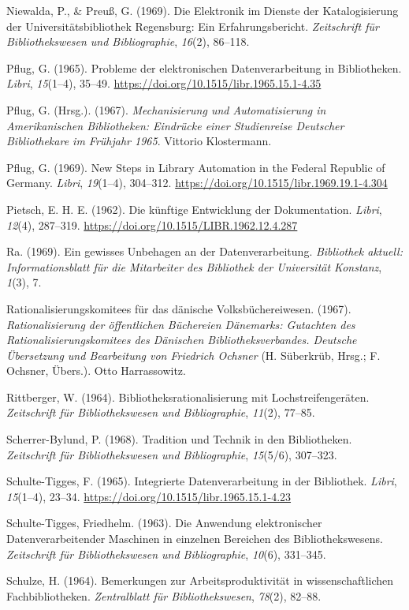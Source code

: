 \documentclass[a4paper,
fontsize=11pt,
oneside,
numbers=noperiodatend,
parskip=half-,
bibliography=totoc,
final
]{scrartcl}
\begin{document}
Niewalda, P., \& Preuß, G. (1969). Die Elektronik im Dienste der
Katalogisierung der Universitätsbibliothek Regensburg: Ein
Erfahrungsbericht. \emph{Zeitschrift für Bibliothekswesen und
Bibliographie}, \emph{16}(2), 86--118.

Pflug, G. (1965). Probleme der elektronischen Datenverarbeitung in
Bibliotheken. \emph{Libri}, \emph{15}(1--4), 35--49.
\url{https://doi.org/10.1515/libr.1965.15.1-4.35}

Pflug, G. (Hrsg.). (1967). \emph{Mechanisierung und Automatisierung in
Amerikanischen Bibliotheken: Eindrücke einer Studienreise Deutscher
Bibliothekare im Frühjahr 1965}. Vittorio Klostermann.

Pflug, G. (1969). New Steps in Library Automation in the Federal
Republic of Germany. \emph{Libri}, \emph{19}(1--4), 304--312.
\url{https://doi.org/10.1515/libr.1969.19.1-4.304}

Pietsch, E. H. E. (1962). Die künftige Entwicklung der Dokumentation.
\emph{Libri}, \emph{12}(4), 287--319.
\url{https://doi.org/10.1515/LIBR.1962.12.4.287}

Ra. (1969). Ein gewisses Unbehagen an der Datenverarbeitung.
\emph{Bibliothek aktuell: Informationsblatt für die Mitarbeiter des
Bibliothek der Universität Konstanz}, \emph{1}(3), 7.

Rationalisierungskomitees für das dänische Volksbüchereiwesen. (1967).
\emph{Rationalisierung der öffentlichen Büchereien Dänemarks: Gutachten
des Rationalisierungskomitees des Dänischen Bibliotheksverbandes.
Deutsche Übersetzung und Bearbeitung von Friedrich Ochsner} (H.
Süberkrüb, Hrsg.; F. Ochsner, Übers.). Otto Harrassowitz.

Rittberger, W. (1964). Bibliotheksrationalisierung mit
Lochstreifengeräten. \emph{Zeitschrift für Bibliothekswesen und
Bibliographie}, \emph{11}(2), 77--85.

Scherrer-Bylund, P. (1968). Tradition und Technik in den Bibliotheken.
\emph{Zeitschrift für Bibliothekswesen und Bibliographie},
\emph{15}(5/6), 307--323.

Schulte-Tigges, F. (1965). Integrierte Datenverarbeitung in der
Bibliothek. \emph{Libri}, \emph{15}(1--4), 23--34.
\url{https://doi.org/10.1515/libr.1965.15.1-4.23}

Schulte-Tigges, Friedhelm. (1963). Die Anwendung elektronischer
Datenverarbeitender Maschinen in einzelnen Bereichen des
Bibliothekswesens. \emph{Zeitschrift für Bibliothekswesen und
Bibliographie}, \emph{10}(6), 331--345.

Schulze, H. (1964). Bemerkungen zur Arbeitsproduktivität in
wissenschaftlichen Fachbibliotheken. \emph{Zentralblatt für
Bibliothekswesen}, \emph{78}(2), 82--88.
\end{document}
